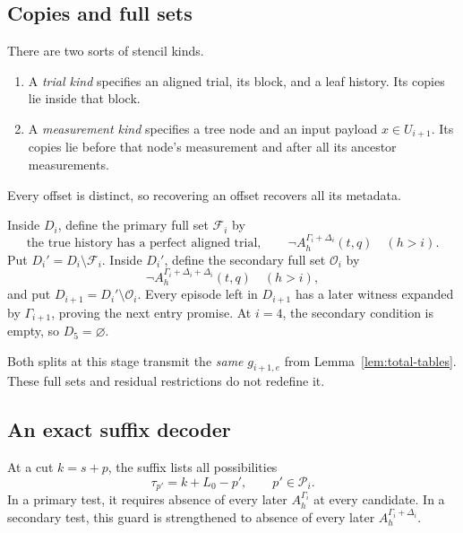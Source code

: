 \subsection{Copies and full sets}

There are two sorts of stencil kinds.
\begin{enumerate}[label=\textup{(\roman*)}]
\item A \emph{trial kind} specifies an aligned trial, its block, and a leaf
history. Its copies lie inside that block.
\item A \emph{measurement kind} specifies a tree node and an input payload
\(x\in U_{i+1}\). Its copies lie before that node's measurement and after all
its ancestor measurements.
\end{enumerate}
Every offset is distinct, so recovering an offset recovers all its metadata.

Inside \(D_i\), define the primary full set \(\mathcal F_i\) by
\begin{equation}\label{eq:primary-full}
 \text{the true history has a perfect aligned trial},\qquad
             \neg A_h^{\Gamma_i+\Delta_i}(t,q)\quad(h>i).
\end{equation}
Put \(D_i'=D_i\setminus\mathcal F_i\).
Inside \(D_i'\), define the secondary full set \(\mathcal O_i\) by
\begin{equation}\label{eq:secondary-full}
             \neg A_h^{\Gamma_i+\Delta_i+\Delta_i}(t,q)\quad(h>i),
\end{equation}
and put \(D_{i+1}=D_i'\setminus\mathcal O_i\).
Every episode left in \(D_{i+1}\) has a later witness expanded by
\(\Gamma_{i+1}\), proving the next entry promise.
At \(i=4\), the secondary condition is empty, so \(D_5=\varnothing\).

Both splits at this stage transmit the \emph{same} \(g_{i+1,e}\) from
Lemma~\ref{lem:total-tables}. These full sets and residual restrictions do
not redefine it.

\subsection{An exact suffix decoder}

At a cut \(k=s+p\), the suffix lists all possibilities
\begin{equation}\label{eq:time-candidates}
                \tau_{p'}=k+L_0-p',\qquad p'\in\mathcal P_i.
\end{equation}
In a primary test, it requires absence of every later
\(A_h^{\Gamma_i}\) at every candidate. In a secondary test, this guard is
strengthened to absence of every later \(A_h^{\Gamma_i+\Delta_i}\).

